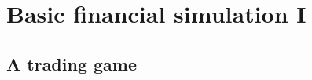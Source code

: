 \chapter{Basic financial simulation I}
\cite{pw_optionpricing_1994, pw_mathfinderiv_1995, pw_derivatives_1998, pw_poqf2ed_2006, pw_iqf2ed_2007, mg_nmof_2019}






\section{A trading game}



